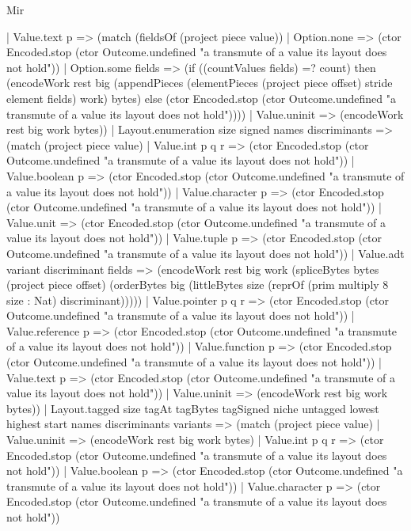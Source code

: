 \begin{lexlean}{Mir}
\begin{semanticmodule}
{          | Value.text p => (match (fieldsOf (project piece value))
            | Option.none => (ctor Encoded.stop (ctor Outcome.undefined "a transmute of a value its layout does not hold"))
            | Option.some fields => (if ((countValues fields) =? count) then (encodeWork rest big (appendPieces (elementPieces (project piece offset) stride element fields) work) bytes) else (ctor Encoded.stop (ctor Outcome.undefined "a transmute of a value its layout does not hold"))))
          | Value.uninit => (encodeWork rest big work bytes))
        | Layout.enumeration size signed names discriminants => (match (project piece value)
          | Value.int p q r => (ctor Encoded.stop (ctor Outcome.undefined "a transmute of a value its layout does not hold"))
          | Value.boolean p => (ctor Encoded.stop (ctor Outcome.undefined "a transmute of a value its layout does not hold"))
          | Value.character p => (ctor Encoded.stop (ctor Outcome.undefined "a transmute of a value its layout does not hold"))
          | Value.unit => (ctor Encoded.stop (ctor Outcome.undefined "a transmute of a value its layout does not hold"))
          | Value.tuple p => (ctor Encoded.stop (ctor Outcome.undefined "a transmute of a value its layout does not hold"))
          | Value.adt variant discriminant fields => (encodeWork rest big work (spliceBytes bytes (project piece offset) (orderBytes big (littleBytes size (reprOf (prim multiply 8 size : Nat) discriminant)))))
          | Value.pointer p q r => (ctor Encoded.stop (ctor Outcome.undefined "a transmute of a value its layout does not hold"))
          | Value.reference p => (ctor Encoded.stop (ctor Outcome.undefined "a transmute of a value its layout does not hold"))
          | Value.function p => (ctor Encoded.stop (ctor Outcome.undefined "a transmute of a value its layout does not hold"))
          | Value.text p => (ctor Encoded.stop (ctor Outcome.undefined "a transmute of a value its layout does not hold"))
          | Value.uninit => (encodeWork rest big work bytes))
        | Layout.tagged size tagAt tagBytes tagSigned niche untagged lowest highest start names discriminants variants => (match (project piece value)
          | Value.uninit => (encodeWork rest big work bytes)
          | Value.int p q r => (ctor Encoded.stop (ctor Outcome.undefined "a transmute of a value its layout does not hold"))
          | Value.boolean p => (ctor Encoded.stop (ctor Outcome.undefined "a transmute of a value its layout does not hold"))
          | Value.character p => (ctor Encoded.stop (ctor Outcome.undefined "a transmute of a value its layout does not hold"))
}
\end{semanticmodule}
\end{lexlean}
